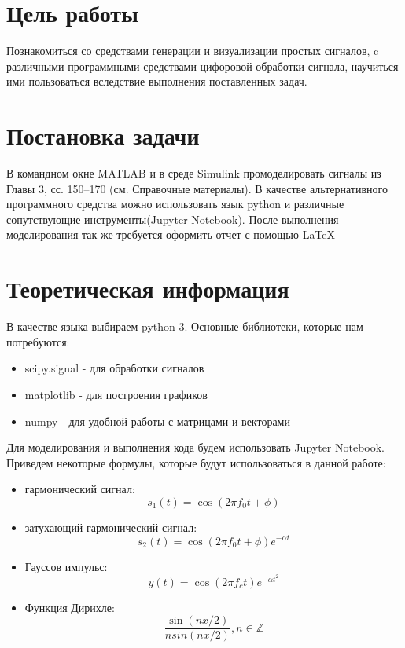 







\section{Цель работы}
Познакомиться со средствами генерации и визуализации простых сигналов, c различными программными средствами цифоровой обработки сигнала, научиться ими пользоваться вследствие выполнения поставленных задач.


\section{Постановка задачи}
В командном окне MATLAB и в среде Simulink промоделировать сигналы из Главы 3, сс. 150–170 (см. Справочные материалы). В качестве альтернативного программного средства можно использовать язык python и различные сопутствующие инструменты(Jupyter Notebook). После выполнения моделирования так же требуется оформить отчет с помощью LaTeX

\section{Теоретическая информация}
В качестве языка выбираем python 3. Основные библиотеки, которые нам потребуются:

\begin{itemize}
\item scipy.signal - для обработки сигналов
\item matplotlib - для построения графиков
\item numpy - для удобной работы с матрицами и векторами
\end{itemize}


Для моделирования и выполнения кода будем использовать Jupyter Notebook.
Приведем некоторые формулы, которые будут использоваться в данной работе:

\begin{itemize}

\item гармонический сигнал:
	 \begin{equation}\label{eq1} 	
	 	s_1(t) = \cos(2\pi f_0t +\phi)  
	 \end{equation}
\item затухающий гармонический сигнал:
    \begin{equation}\label{eq2} 
    	s_2(t) = \cos(2\pi f_0t+\phi)e^{-\alpha t}
    \end{equation}
\item Гауссов импульс:
    \begin{equation}\label{eq3} 
    	y(t) = \cos(2\pi f_ct)e^{-\alpha t^2} 
    \end{equation}
\item Функция Дирихле:
	\begin{equation}\label{eq4}  
		\dfrac{\sin(nx/2)}{nsin(nx/2)}, n \in \mathbb Z 			
	\end{equation}
			
\end{itemize}

